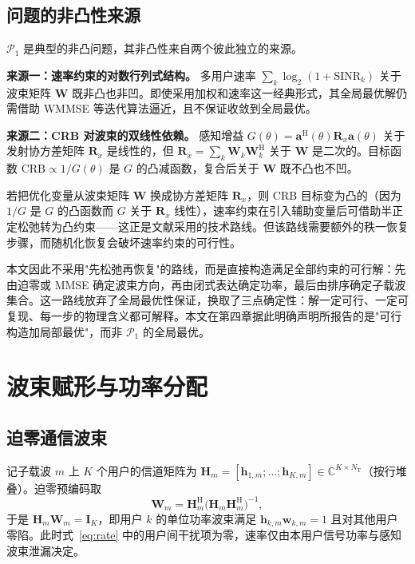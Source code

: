 \subsection{问题的非凸性来源}
\label{sec:nonconvex}

$\mathcal{P}_{1}$ 是典型的非凸问题，其非凸性来自两个彼此独立的来源。

\textbf{来源一：速率约束的对数行列式结构。} 多用户速率 $\sum_k \log_2(1+\mathrm{SINR}_k)$ 关于波束矩阵 $\mathbf{W}$ 既非凸也非凹。即使采用加权和速率这一经典形式，其全局最优解仍需借助 WMMSE 等迭代算法逼近，且不保证收敛到全局最优。

\textbf{来源二：CRB 对波束的双线性依赖。} 感知增益 $G(\theta)=\mathbf{a}^{\mathrm{H}}(\theta)\mathbf{R}_{x}\mathbf{a}(\theta)$ 关于发射协方差矩阵 $\mathbf{R}_{x}$ 是线性的，但 $\mathbf{R}_{x}=\sum_{k}\mathbf{W}_{k}\mathbf{W}_{k}^{\mathrm{H}}$ 关于 $\mathbf{W}$ 是二次的。目标函数 $\mathrm{CRB}\propto 1/G(\theta)$ 是 $G$ 的凸减函数，复合后关于 $\mathbf{W}$ 既不凸也不凹。

若把优化变量从波束矩阵 $\mathbf{W}$ 换成协方差矩阵 $\mathbf{R}_{x}$，则 CRB 目标变为凸的（因为 $1/G$ 是 $G$ 的凸函数而 $G$ 关于 $\mathbf{R}_{x}$ 线性），速率约束在引入辅助变量后可借助半正定松弛转为凸约束——这正是文献\cite{fu2024joint,zuo2025robust}采用的技术路线。但该路线需要额外的秩一恢复步骤，而随机化恢复会破坏速率约束的可行性。

本文因此不采用"先松弛再恢复"的路线，而是直接构造满足全部约束的可行解：先由迫零或 MMSE 确定波束方向，再由闭式表达确定功率，最后由排序确定子载波集合。这一路线放弃了全局最优性保证，换取了三点确定性：解一定可行、一定可复现、每一步的物理含义都可解释。本文在第四章据此明确声明所报告的是"可行构造加局部最优"，而非 $\mathcal{P}_{1}$ 的全局最优。

\section{波束赋形与功率分配}
\label{sec:beamforming}

\subsection{迫零通信波束}
\label{sec:zf}

记子载波 $m$ 上 $K$ 个用户的信道矩阵为 $\mathbf{H}_{m}=[\mathbf{h}_{1,m};\ldots;\mathbf{h}_{K,m}]\in\mathbb{C}^{K\times N_{\mathrm{T}}}$（按行堆叠）。迫零预编码取
\begin{equation}
  \mathbf{W}_{m}=\mathbf{H}_{m}^{\mathrm{H}}\bigl(\mathbf{H}_{m}\mathbf{H}_{m}^{\mathrm{H}}\bigr)^{-1},
  \label{eq:zf}
\end{equation}
于是 $\mathbf{H}_{m}\mathbf{W}_{m}=\mathbf{I}_{K}$，即用户 $k$ 的单位功率波束满足 $\mathbf{h}_{k,m}\mathbf{w}_{k,m}=1$ 且对其他用户零陷。此时式~\eqref{eq:rate} 中的用户间干扰项为零，速率仅由本用户信号功率与感知波束泄漏决定。

